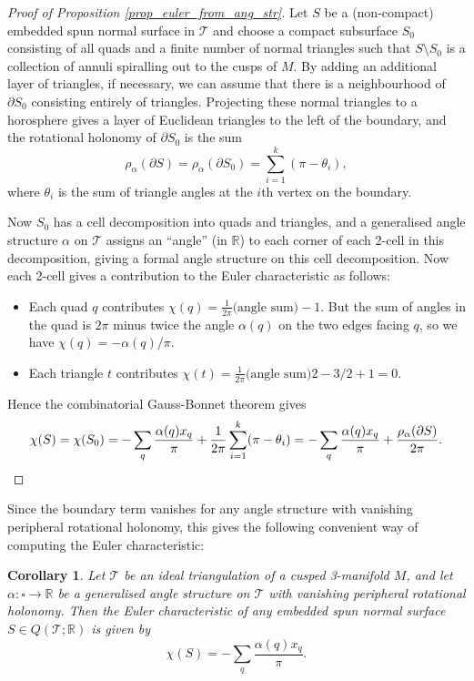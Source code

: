 \documentclass[12pt,reqno]{amsart}  %
\newtheorem{cor}[thm]{Corollary}
\theoremstyle{definition}
\theoremstyle{remark}
\def\R{\mathbb{R}}
\def\be{  \begin{equation} }
\def\ee{  \end{equation} }
\newcommand{\T}{\mathcal{T}}
\def\bd{\partial}
\def\quads{\square}  %
\begin{document}
\begin{proof}[Proof of Proposition \ref{prop_euler_from_ang_str}]
Let $S$ be a (non-compact) embedded spun normal surface in $\T$ and choose 
a compact subsurface $S_0$ consisting of all quads and a finite number 
of normal triangles such that $S \setminus S_0$ is a collection of annuli 
spiralling out to the cusps of $M$. By adding an additional layer of 
triangles, if necessary,  we can assume that there is a neighbourhood of 
$\bd S_0$ consisting entirely of triangles. Projecting these normal 
triangles to a horosphere gives a layer of Euclidean triangles to the 
left of the boundary, and the rotational holonomy of $\bd S_0$ is the sum 
$$
\rho_\alpha(\bd S) = \rho_\alpha(\bd S_0) = \sum_{i=1}^k (\pi-\theta_i),
$$
where $\theta_i$ is the sum of triangle angles at the $i$th vertex on the 
boundary. 

Now $S_0$ has a cell decomposition into quads and triangles, and a 
generalised angle structure $\alpha$ on $\T$ assigns an ``angle'' (in $\R$) 
to each corner of each 2-cell in this decomposition, giving a formal angle 
structure on this cell decomposition. Now each 2-cell gives a contribution 
to the Euler characteristic as follows:
\begin{itemize}
\item
Each quad $q$ contributes 
$\chi(q) = \frac{1}{2\pi}\text{(angle sum)} - 1$. 
But the sum of angles in the quad is $2\pi$ minus twice the angle 
$\alpha(q)$ on the two edges facing $q$,
so we have $\chi(q) = - \alpha(q)/\pi$.
\item 
Each triangle $t$ 
contributes $\chi(t) = \frac{1}{2\pi}\text{(angle sum)} 2-3/2+1= 0$.  
\end{itemize}

Hence the combinatorial Gauss-Bonnet theorem gives
$$
\chi(S) =\chi(S_0) 
 = 
-\sum_q \frac{\alpha(q)x_q}{\pi}  + \frac{1}{2\pi} \sum_{i=1}^k (\pi-\theta_i) \\
= -\sum_q \frac{\alpha(q)x_q}{\pi} + \frac{\rho_\alpha(\bd S)}{2\pi}.
$$
\end{proof}

Since the boundary term vanishes for any angle structure with vanishing 
peripheral rotational holonomy, this gives the following
convenient way of computing the Euler characteristic:

\begin{cor} 
Let $\T$ be an ideal triangulation of a cusped 3-manifold $M$, and 
let $\alpha : \quads \to \R$ be a generalised angle structure on $\T$ with 
vanishing peripheral rotational holonomy. Then the Euler characteristic 
of any embedded spun normal surface $S \in Q(\T;\R)$ is given by
\be 
\chi(S) = - \sum_q \frac{\alpha(q)x_q}{\pi} .
\ee
\end{cor}
\end{document}
